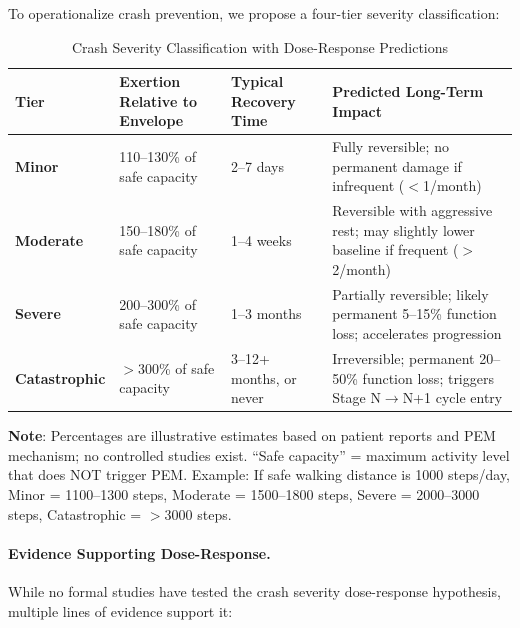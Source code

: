 To operationalize crash prevention, we propose a four-tier severity classification:

\begin{table}[htbp]
\centering
\caption{Crash Severity Classification with Dose-Response Predictions}
\label{tab:crash-severity-tiers}
\small
\begin{tabular}{@{}p{2cm}p{3cm}p{3.5cm}p{5cm}@{}}
\toprule
\textbf{Tier} & \textbf{Exertion Relative to Envelope} & \textbf{Typical Recovery Time} & \textbf{Predicted Long-Term Impact} \\
\midrule
\textbf{Minor} & 110--130\% of safe capacity & 2--7 days & \cellcolor{green!15}Fully reversible; no permanent damage if infrequent ($<$1/month) \\
\addlinespace
\textbf{Moderate} & 150--180\% of safe capacity & 1--4 weeks & \cellcolor{yellow!15}Reversible with aggressive rest; may slightly lower baseline if frequent ($>$2/month) \\
\addlinespace
\textbf{Severe} & 200--300\% of safe capacity & 1--3 months & \cellcolor{orange!15}Partially reversible; likely permanent 5--15\% function loss; accelerates progression \\
\addlinespace
\textbf{Catastrophic} & $>$300\% of safe capacity & 3--12+ months, or never & \cellcolor{red!15}Irreversible; permanent 20--50\% function loss; triggers Stage N$\rightarrow$N+1 cycle entry \\
\bottomrule
\end{tabular}
\par\smallskip
\footnotesize{\textbf{Note}: Percentages are illustrative estimates based on patient reports and PEM mechanism; no controlled studies exist. ``Safe capacity'' = maximum activity level that does NOT trigger PEM. Example: If safe walking distance is 1000 steps/day, Minor = 1100--1300 steps, Moderate = 1500--1800 steps, Severe = 2000--3000 steps, Catastrophic = $>$3000 steps.}
\end{table}

\paragraph{Evidence Supporting Dose-Response.}

While no formal studies have tested the crash severity dose-response hypothesis, multiple lines of evidence support it:

